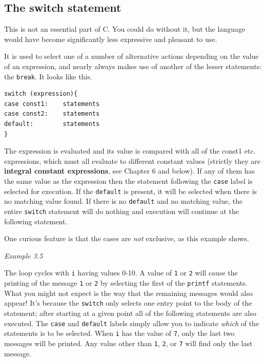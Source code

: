   

  \subsection{The switch statement}
   

   This is not an essential part of C. You could do without it, but
    the language would have become significantly less expressive and pleasant
    to use.


   It is used to select one of a number of alternative actions depending on
    the value of an expression, and nearly always makes use of another of the
    lesser statements: the \texttt{break}. It looks like this.


   \begin{Verbatim}
switch (expression){
case const1:    statements
case const2:    statements
default:        statements
}
\end{Verbatim}

   The expression is evaluated and its value is compared with
    all of the const1 etc. expressions, which must all evaluate
    to different constant values (strictly they are \textbf{integral constant
    expressions}, see Chapter 6 and below). If any of them
    has the same value as the expression then the statement
    following the \texttt{case} label is selected for execution. If the
    \texttt{default} is present, it will be selected when there is no
    matching value found. If there is no \texttt{default} and no matching
    value, the entire \texttt{switch} statement will do nothing and
    execution will continue at the following statement.


   One curious feature is that the cases are \textit{not} exclusive, as
    this example shows.


   \begin{center}\textit{Example 3.5}\end{center}


   The loop cycles with \texttt{i} having values 0-10. A value of
    \texttt{1} or \texttt{2} will cause the printing of the message
    \texttt{1} or \texttt{2} by selecting the first of the
    \texttt{printf} statements. What you might not expect is the way that
    the remaining messages would also appear! It's because the
    \texttt{switch} only selects one entry point to the body of the
    statement; after starting at a given point all of the following statements
    are also executed. The \texttt{case} and \texttt{default} labels
    simply allow you to indicate \textit{which} of the statements is to be
    selected. When \texttt{i} has the value of \texttt{7}, only the
    last two messages will be printed. Any value other than \texttt{1},
    \texttt{2}, or \texttt{7} will find only the last message.


